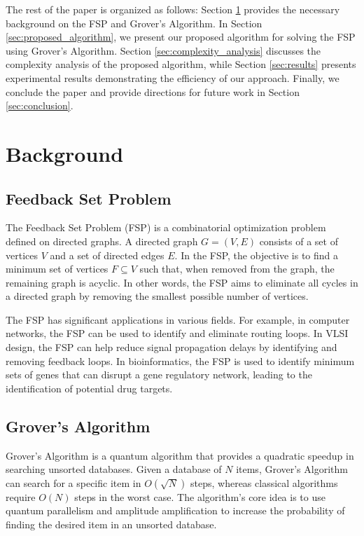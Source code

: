 The rest of the paper is organized as follows: Section \ref{sec:background} provides the necessary background on the FSP and Grover's Algorithm. In Section \ref{sec:proposed_algorithm}, we present our proposed algorithm for solving the FSP using Grover's Algorithm. Section \ref{sec:complexity_analysis} discusses the complexity analysis of the proposed algorithm, while Section \ref{sec:results} presents experimental results demonstrating the efficiency of our approach. Finally, we conclude the paper and provide directions for future work in Section \ref{sec:conclusion}.

\section{Background}
\label{sec:background}

\subsection{Feedback Set Problem}
\label{subsec:feedback_set_problem}

The Feedback Set Problem (FSP) is a combinatorial optimization problem defined on directed graphs. A directed graph $G = (V, E)$ consists of a set of vertices $V$ and a set of directed edges $E$. In the FSP, the objective is to find a minimum set of vertices $F \subseteq V$ such that, when removed from the graph, the remaining graph is acyclic. In other words, the FSP aims to eliminate all cycles in a directed graph by removing the smallest possible number of vertices.

The FSP has significant applications in various fields. For example, in computer networks, the FSP can be used to identify and eliminate routing loops. In VLSI design, the FSP can help reduce signal propagation delays by identifying and removing feedback loops. In bioinformatics, the FSP is used to identify minimum sets of genes that can disrupt a gene regulatory network, leading to the identification of potential drug targets.

\subsection{Grover's Algorithm}
\label{subsec:grover_algorithm}

Grover's Algorithm is a quantum algorithm that provides a quadratic speedup in searching unsorted databases. Given a database of $N$ items, Grover's Algorithm can search for a specific item in $O(\sqrt{N})$ steps, whereas classical algorithms require $O(N)$ steps in the worst case. The algorithm's core idea is to use quantum parallelism and amplitude amplification to increase the probability of finding the desired item in an unsorted database.

